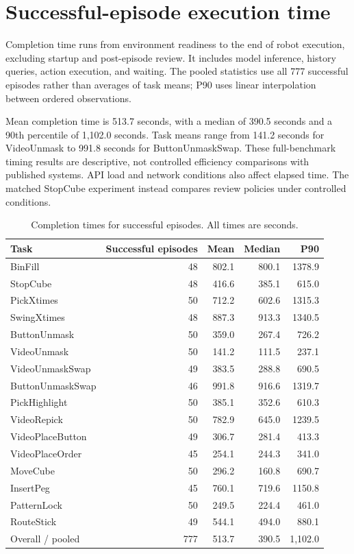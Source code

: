\FloatBarrier
\section{Successful-episode execution time}
\label{app:completion-time}
Completion time runs from environment readiness to the end of robot execution, excluding startup and post-episode review. It includes model inference, history queries, action execution, and waiting. The pooled statistics use all 777 successful episodes rather than averages of task means; P90 uses linear interpolation between ordered observations.

Mean completion time is 513.7 seconds, with a median of 390.5 seconds and a 90th percentile of 1,102.0 seconds. Task means range from 141.2 seconds for VideoUnmask to 991.8 seconds for ButtonUnmaskSwap. These full-benchmark timing results are descriptive, not controlled efficiency comparisons with published systems. API load and network conditions also affect elapsed time. The matched StopCube experiment instead compares review policies under controlled conditions.

\begin{table}[!htbp]
\centering\small
\caption{Completion times for successful episodes. All times are seconds.}
\begin{tabular}{@{}lrrrr@{}}
\toprule
Task & Successful episodes & Mean & Median & P90 \\
\midrule
BinFill & 48 & 802.1 & 800.1 & 1378.9 \\
StopCube & 48 & 416.6 & 385.1 & 615.0 \\
PickXtimes & 50 & 712.2 & 602.6 & 1315.3 \\
SwingXtimes & 48 & 887.3 & 913.3 & 1340.5 \\
ButtonUnmask & 50 & 359.0 & 267.4 & 726.2 \\
VideoUnmask & 50 & 141.2 & 111.5 & 237.1 \\
VideoUnmaskSwap & 49 & 383.5 & 288.8 & 690.5 \\
ButtonUnmaskSwap & 46 & 991.8 & 916.6 & 1319.7 \\
PickHighlight & 50 & 385.1 & 352.6 & 610.3 \\
VideoRepick & 50 & 782.9 & 645.0 & 1239.5 \\
VideoPlaceButton & 49 & 306.7 & 281.4 & 413.3 \\
VideoPlaceOrder & 45 & 254.1 & 244.3 & 341.0 \\
MoveCube & 50 & 296.2 & 160.8 & 690.7 \\
InsertPeg & 45 & 760.1 & 719.6 & 1150.8 \\
PatternLock & 50 & 249.5 & 224.4 & 461.0 \\
RouteStick & 49 & 544.1 & 494.0 & 880.1 \\
\midrule
Overall / pooled & 777 & 513.7 & 390.5 & 1,102.0 \\
\bottomrule
\end{tabular}
\end{table}

